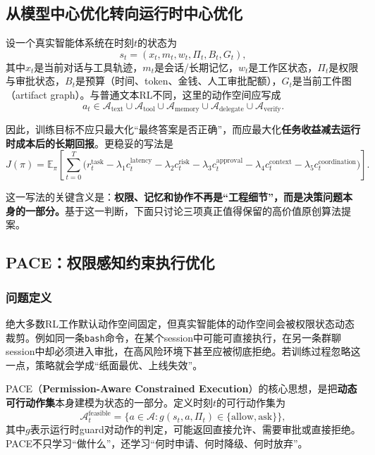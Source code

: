 \documentclass[12pt,a4paper]{article}
\begin{document}
\subsection{从模型中心优化转向运行时中心优化}

设一个真实智能体系统在时刻$t$的状态为
\begin{equation}
s_t = (x_t, m_t, w_t, \Pi_t, B_t, G_t),
\end{equation}
其中$x_t$是当前对话与工具轨迹，$m_t$是会话/长期记忆，$w_t$是工作区状态，$\Pi_t$是权限与审批状态，$B_t$是预算（时间、token、金钱、人工审批配额），$G_t$是当前工件图（artifact graph）。与普通文本RL不同，这里的动作空间应写成
\begin{equation}
a_t \in \mathcal{A}_{\text{text}}
\cup \mathcal{A}_{\text{tool}}
\cup \mathcal{A}_{\text{memory}}
\cup \mathcal{A}_{\text{delegate}}
\cup \mathcal{A}_{\text{verify}}.
\end{equation}

因此，训练目标不应只最大化“最终答案是否正确”，而应最大化\textbf{任务收益减去运行时成本后的长期回报}。更稳妥的写法是
\begin{equation}
J(\pi) = \mathbb{E}_{\pi}\left[\sum_{t=0}^{T}\Big(
r^{\text{task}}_t
- \lambda_1 c^{\text{latency}}_t
- \lambda_2 c^{\text{risk}}_t
- \lambda_3 c^{\text{approval}}_t
- \lambda_4 c^{\text{context}}_t
- \lambda_5 c^{\text{coordination}}_t
\Big)\right].
\end{equation}

这一写法的关键含义是：\textbf{权限、记忆和协作不再是“工程细节”，而是决策问题本身的一部分。}基于这一判断，下面只讨论三项真正值得保留的高价值原创算法提案。

\subsection{PACE：权限感知约束执行优化}

\subsubsection{问题定义}

绝大多数RL工作默认动作空间固定，但真实智能体的动作空间会被权限状态动态裁剪。例如同一条\texttt{bash}命令，在某个session中可能可直接执行，在另一条群聊session中却必须进入审批，在高风险环境下甚至应被彻底拒绝。若训练过程忽略这一点，策略就会学成“纸面最优、上线失效”。

PACE（\textbf{Permission-Aware Constrained Execution}）的核心思想，是把\textbf{动态可行动作集}本身建模为状态的一部分。定义时刻$t$的可行动作集为
\begin{equation}
\mathcal{A}_t^{\text{feasible}} = \{a \in \mathcal{A}: g(s_t,a,\Pi_t)\in \{\text{allow},\text{ask}\}\},
\end{equation}
其中$g$表示运行时guard对动作的判定，可能返回直接允许、需要审批或直接拒绝。PACE不只学习“做什么”，还学习“何时申请、何时降级、何时放弃”。
\end{document}
